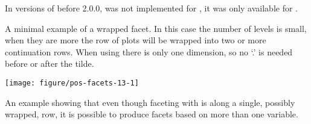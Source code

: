 \documentclass[krantz2]{krantz}\usepackage{knitr}%
\begin{document}
\begin{infobox}
\sloppy
In versions of \ggplot before 2.0.0,  was not implemented for , it was only available for .
\end{infobox}

A minimal example of a wrapped facet. In this case the number of levels is small, when they are more the row of plots will be wrapped into two or more continuation rows. When using  there is only one dimension, so no `.' is needed before or after the tilde.

\begin{knitrout}\footnotesize
{}\color{fgcolor}\begin{kframe}
\begin{alltt}
 \hlopt{+} \hlstd{(}\hlopt{~} 
\end{alltt}
\end{kframe}

{\centering \texttt{[image: figure/pos-facets-13-1]} 

}



\end{knitrout}

An example showing that even though faceting with  is along a single, possibly wrapped, row, it is possible to produce facets based on more than one variable.



\begin{knitrout}\footnotesize
{}\color{fgcolor}\begin{kframe}
\begin{alltt}
 \hlopt{+} \hlstd{(}\hlopt{~}  \hlopt{+}  \hlstd{=}\hlstd{)}
\end{alltt}
\end{kframe}
\end{knitrout}

%
%
\end{document}
